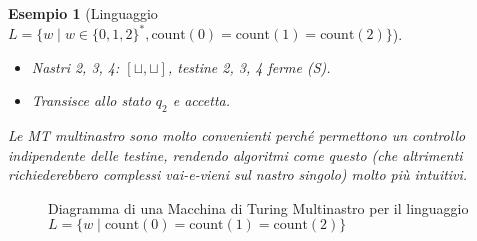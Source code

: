 \documentclass[a4paper, 11pt]{book} %
\newtheorem{example}[theorem]{Esempio}
\theoremstyle{definition}
\begin{document}
\begin{example}[Linguaggio $L = \{w \mid w \in \{0,1,2\}^*, \text{count}(0)=\text{count}(1)=\text{count}(2)\}$]
\begin{itemize}
\begin{itemize}
\begin{itemize}
                    \item Nastri 2, 3, 4: $[\sqcup, \sqcup]$, testine 2, 3, 4 ferme (S).
                    \item Transisce allo stato $q_2$ e accetta.
                \end{itemize}
        \end{itemize}
\end{itemize}
Le MT multinastro sono molto convenienti perché permettono un controllo indipendente delle testine, rendendo algoritmi come questo (che altrimenti richiederebbero complessi vai-e-vieni sul nastro singolo) molto più intuitivi.
\end{example}

\begin{figure}[h!]
    \centering
    \caption{Diagramma di una Macchina di Turing Multinastro per il linguaggio $L=\{w \mid \text{count}(0)=\text{count}(1)=\text{count}(2)\}$}
\end{figure}
\end{document}
